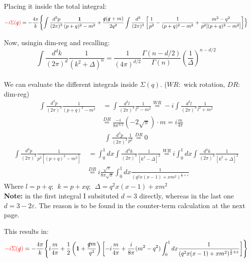 \documentclass[a4paper,11pt,DIV=12]{scrartcl}
\begin{document}
Placing it inside the total integral: 
\begin{align*}
    \textcolor{red} {-i \Sigma(\slashed{q})}=-\frac{4\pi}{k}\Biggl\{ \int \frac{d^3p}{(2\pi)^3} \frac{\mathbf{1}}{(p+q)^2-m^2} + \frac{\slashed{q}(\slashed{q}+m)}{2q^2}\int \frac{d^3}{(2\pi)^3} \left[\frac{1}{p^2} - \frac{1}{(p+q)^2-m^2} + \frac{m^2 - q^2}{p^2[(p+q)^2 - m^2]} \right]  \Bigr\}
\end{align*}

Now, usingin dim-reg and recalling:
$$
\int \frac{d^d k}{(2\pi)^d} \frac{1}{(k^2 + \Delta)^n}
= \frac{1}{(4\pi)^{d/2}} \frac{\Gamma(n - d/2)}{\Gamma(n)}
\left( \frac{1}{\Delta} \right)^{n - d/2}
$$
\\
We can evaluate the different integrals inside $\Sigma(q)$. ($WR:$ wick rotation, $DR:$ dim-reg)
\begin{align*}
    \int \frac{d^3 p}{(2\pi)^3} \frac{1}{(p+q)^2 - m^2}&\ 
= \int \frac{d^3 l}{(2\pi)^3} \frac{1}{l^2 - m^2} \stackrel{WR}{=} -i \int \frac{d^3 l}{(2\pi)^3} \frac{1}{l^2 + m^2} 
\\ &\stackrel{DR}{=}\frac{-i}{8\pi^{3/2}} (-2\sqrt{\pi}) \cdot m = i\frac{m}{4 \pi}
\end{align*}
\begin{align*}
    \int \frac{d^3 p}{(2 \pi)^3} \frac{1}{p^2} \stackrel{DR}{=} 0 
\end{align*}
\begin{align*}
    \int \frac{d^3 p}{(2\pi)^3} \frac{1}{p^2 [(p+q)^2-m^2]}&\ =\int_0^1 dx \int \frac{d^3 k }{(2 \pi)^3}\frac{1}{[k^2-\Delta]^2} \stackrel{WR}{=} i \int_0^1 dx \int \frac{d^3 k }{(2 \pi)^3} \frac{1}{[k^2 + \Delta]^2}
    \\ &\stackrel{DR}{=}i\frac{\sqrt{\pi}}{8 \pi \sqrt{\pi}}\int_0^1 dx \frac{1}{(q^2 x(x-1)+xm^2)^{\frac{1}{2}+\varepsilon}}
\end{align*}
Where $l=p+q;\ \ k=p+xq; \ \ \Delta=q^2 x(x-1)+xm^2$
\\
\textbf{Note:} in the first integral I subsituted $d=3$ directly, whereas in the last one $d=3-2\varepsilon$. The reason is to be found in the counter-term calculation at the next page.

This results in: 
\begin{align*}
    \textcolor{red} {-i \Sigma(\slashed{q})}= -\frac{4 \pi}{k}\Biggl\{ i\frac{m}{4\pi} + \frac{1}{2} \left(\mathbf{1}+\frac{\slashed{q}m}{q^2}\right) \left[ -i\frac{m}{4 \pi} + \frac{i}{8 \pi} (m^2 - q^2)\int_0^1 dx \frac{1}{(q^2 x(x-1)+xm^2)^{\frac{1}{2}+\varepsilon}}  \right] \Biggr\}
\end{align*}
\end{document}
